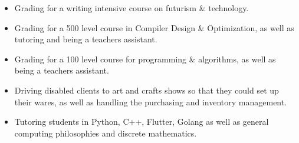 \documentclass[10pt,a4paper,ragged2e,withhyper]{altacv}
\begin{document}

\makecvheader



\begin{paracol}{2}


\begin{itemize}
\item Grading for a writing intensive course on futurism \& technology.
\item Grading for a 500 level course in Compiler Design \& Optimization, as well as tutoring and being a teachers assistant.
\item Grading for a 100 level course for programming \& algorithms, as well as being a teachers assistant.
\end{itemize}

\divider

\begin{itemize}
\item Driving disabled clients to art and crafts shows so that they could set up their wares, as well as handling the purchasing and inventory management.
\end{itemize}

\begin{itemize}
\item Tutoring students in Python, C++, Flutter, Golang as well as general computing philosophies and discrete mathematics.
\end{itemize}




\divider



\end{paracol}
\end{document}
